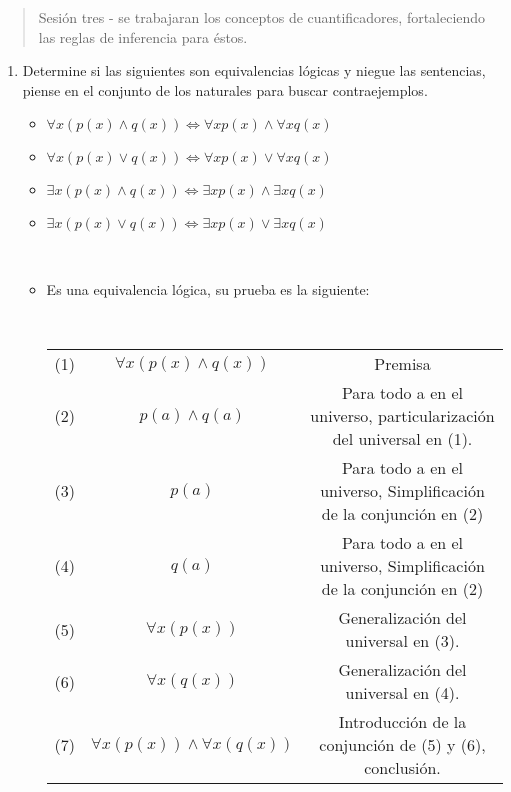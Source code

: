 



\maketitle

\begin{abstract}
    Sesión tres - se trabajaran los conceptos de cuantificadores, fortaleciendo las reglas de inferencia para éstos.
\end{abstract}

\begin{enumerate}
    \item Determine si las siguientes son equivalencias lógicas y niegue las sentencias, piense en el conjunto de los naturales para buscar contraejemplos.
    \begin{multicols}{2}
    \begin{itemize}
        \item $\forall x (p(x) \wedge q(x)) \Leftrightarrow \forall x p(x) \wedge \forall x q(x)  $
        \item $\forall x (p(x) \vee q(x)) \Leftrightarrow \forall x p(x) \vee \forall x q(x)  $
    \end{itemize}
    \columnbreak
    \begin{itemize}
        \item $\exists x (p(x) \wedge q(x)) \Leftrightarrow \exists x p(x) \wedge \exists x q(x)  $
        \item $ \exists x (p(x) \vee q(x)) \Leftrightarrow \exists x p(x) \vee \exists x q(x)  $
    \end{itemize}
    \end{multicols}

    \begin{solucion}
    ~\newline
    \begin{itemize}
        \item Es una equivalencia lógica, su prueba es la siguiente:

        ~\newline
        \begin{tabular}{c c c}
            (1) &   $\forall x (p(x) \wedge q(x)) $& Premisa  \\
            (2) & $  p(a) \wedge q(a) $ & Para todo a en el universo, particularización del universal en (1).  \\
            (3) & $ p(a) $ & Para todo a en el universo, Simplificación de la conjunción en (2) \\
            (4) &  $ q(a) $ & Para todo a en el universo, Simplificación de la conjunción en (2) \\
            (5) & $\forall x (p(x))$ & Generalización del universal en (3). \\
            (6) & $\forall x (q(x))$ & Generalización del universal en (4). \\
            (7) & $\forall x (p(x)) \wedge \forall x (q(x)) $ & Introducción de la conjunción de (5) y (6), conclusión.
        \end{tabular}


\end{itemize}
\end{solucion}
\end{enumerate}

